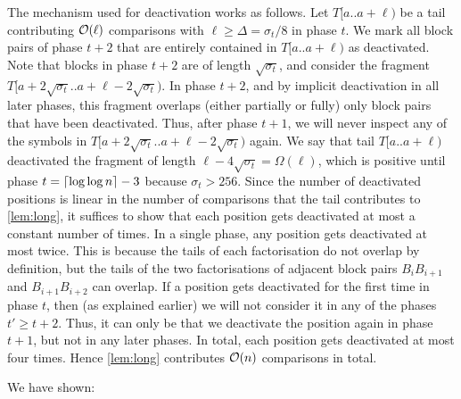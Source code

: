 The mechanism used for deactivation works as follows. Let $T[a..a + \ell)$ be a tail contributing $\mathcal{O}(\ell)$ comparisons with $\ell \geq \Delta = \sigma_t / 8$ in phase $t$. We mark all block pairs of phase $t + 2$ that are entirely contained in $T[a..a + \ell)$ as deactivated. Note that blocks in phase $t + 2$ are of length $\sqrt{\sigma_t}$, and consider the fragment $T[a + 2\sqrt{\sigma_t}..a + \ell - 2\sqrt{\sigma_t})$. In phase $t + 2$, and by implicit deactivation in all later phases, this fragment overlaps (either partially or fully) only block pairs that have been deactivated. Thus, after phase $t + 1$, we will never inspect any of the symbols in $T[a + 2\sqrt{\sigma_t}..a + \ell - 2\sqrt{\sigma_t})$ again. We say that tail $T[a..a + \ell)$ deactivated the fragment of length $\ell - 4\sqrt{\sigma_t} = \Omega(\ell)$, which is positive until phase $t=\left\lceil\log \log n\right\rceil-3$ because $\sigma_t > 256$. Since the number of deactivated positions is linear in the number of comparisons that the tail contributes to \cref{lem:long}, it suffices to show that each position gets deactivated at most a constant number of times. 
In a single phase, any position gets deactivated at most twice. This is because the tails of each factorisation do not overlap by definition, but the tails of the two factorisations of adjacent block pairs $B_iB_{i + 1}$ and $B_{i + 1}B_{i + 2}$ can overlap. If a position gets deactivated for the first time in phase $t$, then (as explained earlier) we will not consider it in any of the phases $t' \geq t + 2$. Thus, it can only be that we deactivate the position again in phase $t + 1$, but not in any later phases. In total, each position gets deactivated at most four times. Hence \cref{lem:long} contributes $\mathcal{O}(n)$ comparisons in total.

We have shown:

\upperbound*

